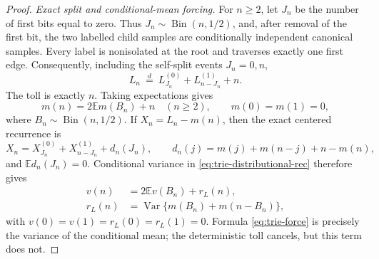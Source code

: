 \documentclass[11pt]{article}
\numberwithin{equation}{section}
\newcommand{\1}{\mathbf 1}\newcommand{\F}{\mathcal F}\newcommand{\D}{\mathcal D}
\begin{document}
\begin{proof}
\emph{Exact split and conditional-mean forcing.}
For $n\ge2$, let $J_n$ be the number of first bits equal to zero.  Thus
$J_n\sim\operatorname {Bin}(n,1/2)$, and, after removal of the first bit,
the two labelled child samples are conditionally independent canonical
samples.  Every label is nonisolated at the root and traverses exactly one
first edge.  Consequently, including the self-split events $J_n=0,n$,
\begin{equation}
 L_n\ \mathrel{\mathop=\limits^{d}}\
 L_{J_n}^{(0)}+L_{n-J_n}^{(1)}+n.             \label{eq:trie-distributional-rec}
\end{equation}
The toll is exactly $n$.  Taking expectations gives
\begin{equation}
 m(n)=2\mathbb Em(B_n)+n\quad(n\ge2),\qquad m(0)=m(1)=0,     \label{eq:trie-mean-rec}
\end{equation}
where $B_n\sim\operatorname {Bin}(n,1/2)$.  If
$X_n=L_n-m(n)$, then the exact centered recurrence is
\begin{equation}
 X_n=X_{J_n}^{(0)}+X_{n-J_n}^{(1)}+d_n(J_n),\qquad
 d_n(j)=m(j)+m(n-j)+n-m(n),                  \label{eq:trie-centered-rec}
\end{equation}
and $\mathbb Ed_n(J_n)=0$.  Conditional variance in
\eqref{eq:trie-distributional-rec} therefore gives
\begin{align}
 v(n)&=2\mathbb Ev(B_n)+r_L(n),                         \label{eq:trie-variance-rec}\\
 r_L(n)&=\operatorname {Var}\{m(B_n)+m(n-B_n)\},        \label{eq:trie-force}
\end{align}
with $v(0)=v(1)=r_L(0)=r_L(1)=0$.  Formula
\eqref{eq:trie-force} is precisely the variance of the conditional mean;
the deterministic toll cancels, but this term does not.


\end{proof}
\end{document}
